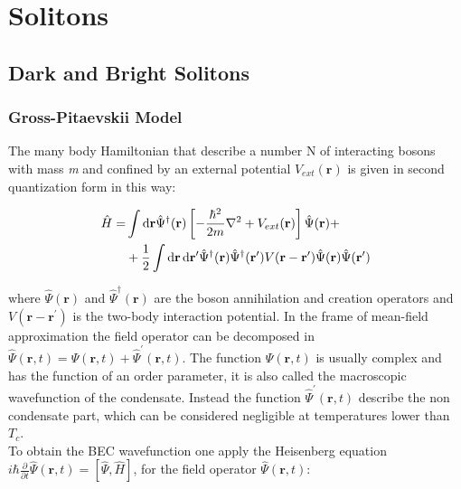 \documentclass[../main.tex]{subfiles}
\begin{document}
\chapter{Solitons}

\section{Dark and Bright Solitons}

\subsection{Gross-Pitaevskii Model}

The many body Hamiltonian that describe a number N of interacting bosons with mass \textit{m} and confined by an external potential $V_{ext}(\textbf{r})$ is given in second quantization form in this way:

\begin{equation}
\begin{split}
\hat{H} = & \int \mathop{}\!\mathrm{d}{\textbf{r}} \hat{\Psi}^\dagger (\textbf{r}) \left[ -\frac{\hbar^2}{2m} \nabla^2 + V_{ext} (\textbf{r}) \right] \hat{\Psi} (\textbf{r})+ \\ & + \frac{1}{2} \int \mathop{}\!\mathrm{d}{\textbf{r}} \mathop{}\!\mathrm{d}{\textbf{r}^\prime} \hat{\Psi}^\dagger (\textbf{r}) \hat{\Psi}^\dagger (\textbf{r}^\prime) V(\textbf{r} - \textbf{r}^\prime) \hat{\Psi} (\textbf{r}) \hat{\Psi} (\textbf{r}^\prime)
\end{split}
\end{equation}

where $\hat{\Psi}(\textbf{r})$ and $\hat{\Psi}^\dagger(\textbf{r})$ are the boson annihilation and creation operators and $V(\textbf{r} - \textbf{r}^\prime)$ is the two-body interaction potential. In the frame of mean-field approximation the field operator can be decomposed in $\hat{\Psi}(\textbf{r}, t) = \Psi(\textbf{r}, t) + \hat{\Psi}^\prime (\textbf{r}, t)$. The function $\Psi(\textbf{r}, t)$ is usually complex and has the function of an order parameter, it is also called the macroscopic wavefunction of the condensate. Instead the function $\hat{\Psi}^\prime (\textbf{r}, t)$ describe the non condensate part, which can be considered negligible at temperatures lower than $T_c$.\\ 
To obtain the BEC wavefunction one apply the Heisenberg equation $i\hbar \frac{\partial}{\partial t} \hat{\Psi}(\textbf{r}, t) = [\hat{\Psi},\hat{H}]$, for the field operator $\hat{\Psi}(\textbf{r}, t)$:
\end{document}
